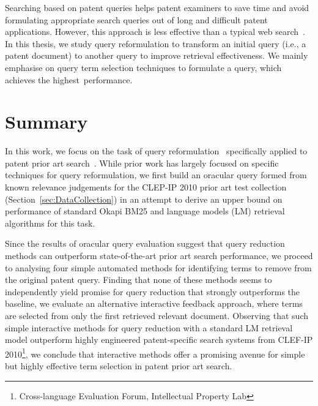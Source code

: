 Searching based on patent queries helps patent examiners to save time and avoid 
formulating appropriate search queries out of long and difficult patent applications. 
 However, this approach is less effective than a typical web search~\citep{lupu2013patent}. 
 In this thesis, we study query reformulation to transform an initial query (i.e., a patent document) to another query to improve retrieval effectiveness. We mainly emphasise on query term selection techniques to formulate a query, which achieves the highest~performance.


\section{Summary}
\label{sec:summary}
In this work, we focus on the task of query
reformulation~\citep{Baeza-Yates2011} specifically applied to patent
prior art
search~\citep{xue2009transforming,Piroi2010,mahdabi2014patent}. While
prior work has largely focused on specific techniques for query
reformulation, 
 we first
build an oracular query formed from known relevance judgements for the
CLEP-IP 2010 prior art test collection~\citep{Piroi2010} (Section~\ref{sec:DataCollection}) in an attempt
to derive an upper bound on performance of standard Okapi BM25 and
language models (LM) retrieval algorithms for this task.  

Since the
results of oracular query evaluation suggest that query reduction methods can
outperform state-of-the-art prior art search performance, 
we proceed to analysing four simple
automated methods for identifying terms to remove from the original
patent query.  Finding that none of these methods seems to
independently yield promise for query reduction that strongly
outperforms the baseline, 
we evaluate an alternative
interactive feedback approach, where terms are selected from only the
first retrieved relevant document.  Observing that such simple
interactive methods for query reduction with a standard LM retrieval
model outperform highly engineered patent-specific search systems from
CLEF-IP 2010\footnote{Cross-language Evaluation Forum, Intellectual Property Lab}, we conclude that interactive methods offer a promising
avenue for simple but highly effective term selection in patent prior
art search.

